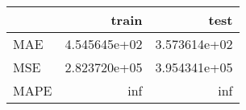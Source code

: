 \begin{tabular}{lrr}
\toprule
{} &         train &          test \\
\midrule
MAE  &  4.545645e+02 &  3.573614e+02 \\
MSE  &  2.823720e+05 &  3.954341e+05 \\
MAPE &           inf &           inf \\
\bottomrule
\end{tabular}
